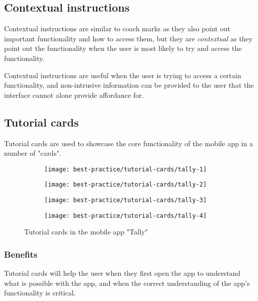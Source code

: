 \subsection{Contextual instructions}

Contextual instructions are similar to coach marks as they also point out important functionality and how to access them, but they are \textit{contextual} as they point out the functionality when the user is most likely to try and access the functionality.

Contextual instructions are useful when the user is trying to access a certain functionality, and non-intrusive information can be provided to the user that the interface cannot alone provide affordance for.


\subsection{Tutorial cards}

Tutorial cards are used to showcase the core functionality of the mobile app in a number of "cards".

\begin{figure}[ht]
\begin{subfigure}{.25\textwidth}
  \centering
  \texttt{[image: best-practice/tutorial-cards/tally-1]}
  \label{subfig:best-practice/tutorial-cards/tally-1}
\end{subfigure}%
\begin{subfigure}{.25\textwidth}
  \centering
  \texttt{[image: best-practice/tutorial-cards/tally-2]}
  \label{subfig:best-practice/tutorial-cards/tally-2}
\end{subfigure}%
\begin{subfigure}{.25\textwidth}
  \centering
  \texttt{[image: best-practice/tutorial-cards/tally-3]}
  \label{subfig:best-practice/tutorial-cards/tally-3}
\end{subfigure}%
\begin{subfigure}{.25\textwidth}
  \centering
  \texttt{[image: best-practice/tutorial-cards/tally-4]}
  \label{subfig:best-practice/tutorial-cards/tally-4}
\end{subfigure}%
\caption{Tutorial cards in the mobile app "Tally"}
\label{fig:general-overview}
\end{figure}

\subsubsection{Benefits}
Tutorial cards will help the user when they first open the app to understand what is possible with the app, and when the correct understanding of the app's functionality is critical.

